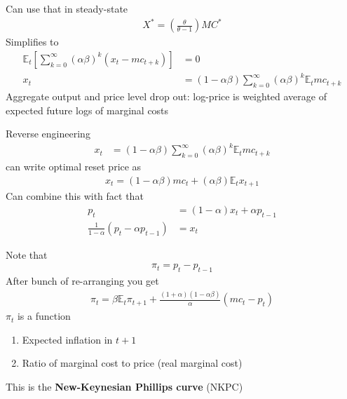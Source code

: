 \documentclass{beamer}
\begin{document}
\begin{frame}
  Can use that in steady-state 
  \begin{align}
    X^* = \left( \frac{\theta}{\theta-1}\right ) MC^*
  \end{align}
  Simplifies to
  \begin{align}
    \mathbb{E}_t \left[ \sum_{k=0}^{\infty} (\alpha \beta)^k (x_t - mc_{t+k}) \right] &=0 \\ \nonumber  
    x_t &= (1-\alpha \beta) \sum_{k=0}^{\infty} (\alpha \beta)^k \mathbb{E}_t mc_{t+k}
  \end{align}
  Aggregate output and price level drop out: log-price is weighted average of expected future logs  of marginal costs
\end{frame}

\begin{frame}
  Reverse engineering 
  \begin{align}
    x_t &= (1-\alpha \beta) \sum_{k=0}^{\infty} (\alpha \beta)^k \mathbb{E}_t mc_{t+k}
  \end{align}
  can write optimal reset price as
  \begin{align}
  x_t=(1-\alpha \beta) mc_t + (\alpha \beta) \mathbb{E}_t x_{t+1}
 \end{align}
 Can combine this with fact that 
\begin{align}
  p_t &= (1-\alpha)x_t+\alpha p_{t-1}\\ \nonumber
  \frac{1}{1-\alpha}(p_t-\alpha p_{t-1}) &= x_t 
\end{align}
\end{frame}

\begin{frame}
  Note that 
  \begin{align}
    \pi_t=p_t-p_{t-1}
  \end{align}
  After bunch of re-arranging you get  
\begin{align}
  \pi_t= \beta \mathbb{E}_t \pi_{t+1} + \frac{(1+\alpha)(1-\alpha \beta)}{\alpha}(mc_t - p_t)
\end{align}
$\pi_t$ is a function 
\begin{enumerate}
  \item Expected inflation in $t+1$
  \item Ratio of marginal cost to price (real marginal cost)
\end{enumerate}
  This is the \textbf{New-Keynesian Phillips curve} (NKPC)
\end{frame}
\end{document}
